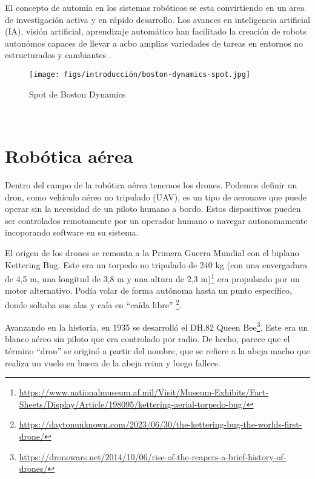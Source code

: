 El concepto de automía en los sistemas robóticos se esta convirtiendo en un area de investigación activa y en rápido desarrollo. Los avances en inteligencia artificial (IA), visión 
artificial, aprendizaje automático han facilitado la creación de robots autonómos capaces de llevar a acbo amplias variedades de tareas en entornos no estructurados y cambiantes \cite{upm70576}. \newline 

\begin{figure} [H]
  \begin{center}
    \texttt{[image: figs/introducción/boston-dynamics-spot.jpg]}
  \end{center}
  \caption{Spot de Boston Dynamics}
  \label{fig:Boston Dynamics}
\end{figure}\
\newpage
\section{Robótica aérea}
\label{sec:subseccion}

Dentro del campo de la robótica aérea tenemos los drones. Podemos definir un dron, como vehículo aéreo no tripulado (UAV), es un tipo de aeronave que puede operar sin la 
necesidad de un piloto humano a bordo. Estos dispositivos pueden ser controlados remotamente por un operador humano o navegar autonomamente incoporando software 
en su sistema. \newline

El origen de los drones se remonta a la Primera Guerra Mundial con el biplano Kettering Bug.
Este era un torpedo no tripulado de 240 kg (con una envergadura de 4,5 m, una longitud de
3,8 m y una altura de 2,3 m)\footnote{\url{https://www.nationalmuseum.af.mil/Visit/Museum-Exhibits/Fact-Sheets/Display/Article/198095/kettering-aerial-torpedo-bug/}} era propulsado por un motor alternativo. Podía volar de
forma autónoma hasta un punto específico, donde soltaba sus alas y caía en “caída libre” \footnote{\url{https://daytonunknown.com/2023/06/30/the-kettering-bug-the-worlds-first-drone/}}.\newline

Avanzando en la historia, en 1935 se desarrolló el DH.82 Queen Bee\footnote{\url{https://dronewars.net/2014/10/06/rise-of-the-reapers-a-brief-history-of-drones/}}. Este era un blanco aéreo sin piloto que era controlado por radio. De hecho, parece que el término “dron” se originó a partir del nombre, que se refiere a la abeja macho que realiza un vuelo en busca de la abeja reina y luego fallece. \newline

